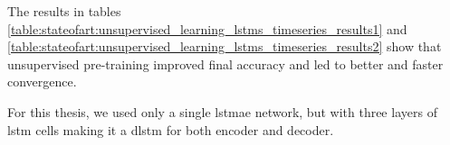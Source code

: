 The results in tables \ref{table:stateofart:unsupervised_learning_lstms_timeseries_results1} and \ref{table:stateofart:unsupervised_learning_lstms_timeseries_results2} show that unsupervised pre-training improved final accuracy and led to better and faster convergence. \par

For this thesis, we used only a single \gls{lstmae} network, but with three layers of \gls{lstm} cells making it a \gls{dlstm} for both encoder and decoder.

%
%



\newpage
